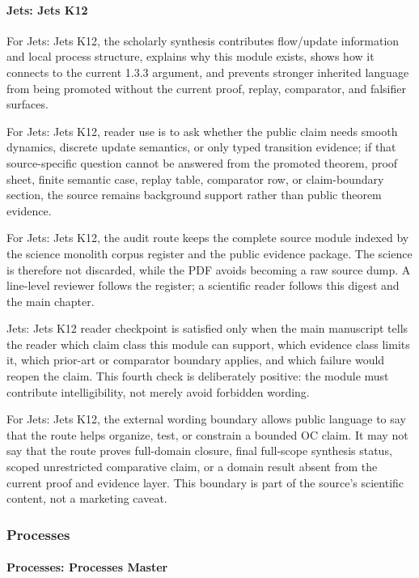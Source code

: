 \paragraph{Jets: Jets K12}

For Jets: Jets K12, the scholarly synthesis contributes flow/update information and local process structure, explains why this module exists, shows how it connects to the current 1.3.3 argument, and prevents stronger inherited language from being promoted without the current proof, replay, comparator, and falsifier surfaces.


For Jets: Jets K12, reader use is to ask whether the public claim needs smooth dynamics, discrete update semantics, or only typed transition evidence; if that source-specific question cannot be answered from the promoted theorem, proof sheet, finite semantic case, replay table, comparator row, or claim-boundary section, the source remains background support rather than public theorem evidence.


For Jets: Jets K12, the audit route keeps the complete source module indexed by the science monolith corpus register and the public evidence package. The science is therefore not discarded, while the PDF avoids becoming a raw source dump. A line-level reviewer follows the register; a scientific reader follows this digest and the main chapter.


Jets: Jets K12 reader checkpoint is satisfied only when the main manuscript tells the reader which claim class this module can support, which evidence class limits it, which prior-art or comparator boundary applies, and which failure would reopen the claim. This fourth check is deliberately positive: the module must contribute intelligibility, not merely avoid forbidden wording.


For Jets: Jets K12, the external wording boundary allows public language to say that the route helps organize, test, or constrain a bounded OC claim. It may not say that the route proves full-domain closure, final full-scope synthesis status, scoped unrestricted comparative claim, or a domain result absent from the current proof and evidence layer. This boundary is part of the source's scientific content, not a marketing caveat.


\subsubsection{Processes}

\paragraph{Processes: Processes Master}

